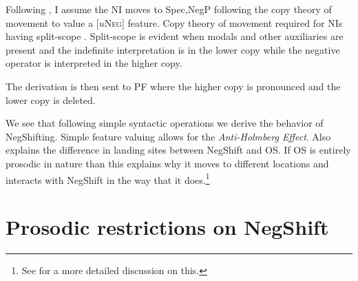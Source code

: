 \documentclass[12pt, letterpaper]{article}
\begin{document}
\ea Following \cite{zeijlstraSyntacticallyComplexStatus2011}, I assume the NI moves to Spec,NegP following the copy theory of movement \citep{chomskyMinimalistProgramLinguistic1993} to value a [$u$\textsc{Neg}] feature.
	\ea Copy theory of movement required for NIs having split-scope \citep{iatridouNegativeDPsAMovement2011,zeijlstraSyntacticallyComplexStatus2011}. 
	\ex Split-scope is evident when modals and other auxiliaries are present and the indefinite interpretation is in the lower copy while the negative operator is interpreted in the higher copy.
	\z 

\ex
{}

\ex The derivation is then sent to PF where the higher copy is pronounced and the lower copy is deleted.

\ex We see that following simple syntactic operations we derive the behavior of NegShifting. 
	\ea Simple feature valuing allows for the \emph{Anti-Holmberg Effect}.
	\ex Also explains the difference in landing sites between NegShift and OS.
	\ex If OS is entirely prosodic in nature than this explains why it moves to different locations and interacts with NegShift in the way that it does.\footnote{See \cite{brinkerhoffHolmbergGeneralizationSyntaxprosody2021} for a more detailed discussion on this.} 
	\z  
\z 

\section{Prosodic restrictions on NegShift} \label{sec:PROSODY}
\end{document}
